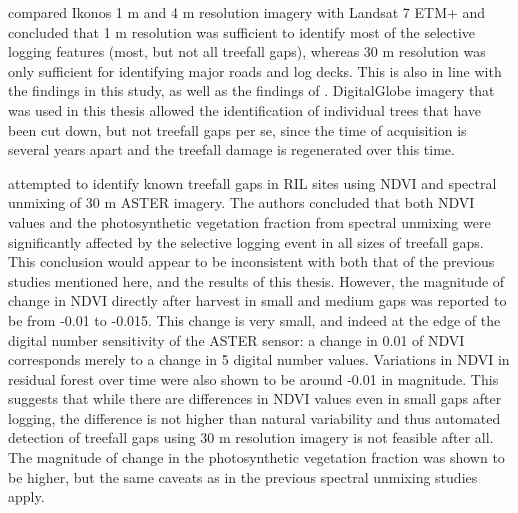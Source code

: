 \documentclass[a4paper,12pt]{scrbook}
\begin{document}
\citet{read_spatial_2003} compared Ikonos 1 m and 4 m resolution imagery with Landsat 7 \ac{ETM+} and concluded that 1 m resolution was sufficient to identify most of the selective logging features (most, but not all treefall gaps), whereas 30 m resolution was only sufficient for identifying major roads and log decks. This is also in line with the findings in this study, as well as the findings of \citet{asner_remote_2002}. DigitalGlobe imagery that was used in this thesis allowed the identification of individual trees that have been cut down, but not treefall gaps per se, since the time of acquisition is several years apart and the treefall damage is regenerated over this time.

\citet{broadbent_recovery_2006} attempted to identify known treefall gaps in \ac{RIL} sites using \ac{NDVI} and spectral unmixing of 30 m \ac{ASTER} imagery. The authors concluded that both \ac{NDVI} values and the photosynthetic vegetation fraction from spectral unmixing were significantly affected by the selective logging event in all sizes of treefall gaps. This conclusion would appear to be inconsistent with both that of the previous studies mentioned here, and the results of this thesis. However, the magnitude of change in \ac{NDVI} directly after harvest in small and medium gaps was reported to be from -0.01 to -0.015. This change is very small, and indeed at the edge of the digital number sensitivity of the \ac{ASTER} sensor: a change in 0.01 of \ac{NDVI} corresponds merely to a change in 5 digital number values. Variations in \ac{NDVI} in residual forest over time were also shown to be around -0.01 in magnitude. This suggests that while there are differences in \ac{NDVI} values even in small gaps after logging, the difference is not higher than natural variability and thus automated detection of treefall gaps using 30 m resolution imagery is not feasible after all. The magnitude of change in the photosynthetic vegetation fraction was shown to be higher, but the same caveats as in the previous spectral unmixing studies apply.
\end{document}

